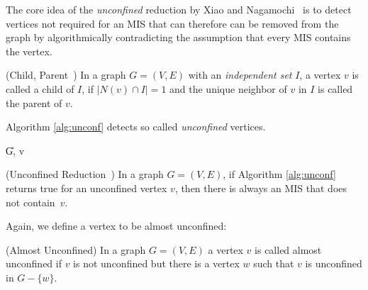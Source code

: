 \documentclass[a4paper,UKenglish,cleveref, autoref, thm-restate]{lipics-v2021}
\begin{document}
The core idea of the \emph{unconfined} reduction by Xiao and
Nagamochi~\cite{XiaoUnconfined} is to detect vertices not required for an MIS
that can therefore can be removed from the graph by algorithmically
contradicting the assumption that every MIS contains the vertex.

\begin{definition} (Child, Parent~\cite{XiaoUnconfined}) In a graph $G=(V,E)$ with an \textit{independent set} $I$, a vertex $v$ is called a child of $I$, if $|N(v)\cap I| = 1$ and the unique neighbor of $v$ in $I$ is called the parent of $v$.
\end{definition}

Algorithm \ref{alg:unconf} detects so called \textit{unconfined} vertices.

\begin{algorithm}[t]
	\caption{Unconfined -- Xiao and Nagamochi
      \cite{XiaoUnconfined}}\label{alg:unconf}
	\DontPrintSemicolon
	
	\U{G, v}	
	
	
\end{algorithm}


\begin{theorem}(Unconfined Reduction~\cite{XiaoUnconfined}) In a graph $G=(V,E)$,
  if Algorithm \ref{alg:unconf} returns true for an unconfined vertex $v$, then
  there is always an MIS that does not contain~$v$.
\end{theorem}

Again, we define a vertex to be almost unconfined:

\begin{definition} (Almost Unconfined)
  In a graph $G=(V,E)$ a vertex $v$ is called almost unconfined if $v$ is not unconfined but there is a vertex $w$ such that $v$ is unconfined in $G-\{w\}$.
\end{definition}
\end{document}
